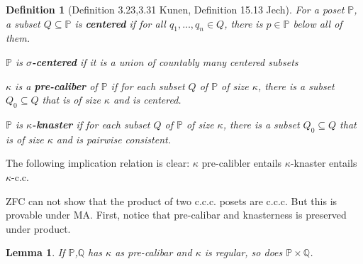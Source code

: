 \documentclass{article}
\newtheorem{definition}{Definition}
\newtheorem{lemma}{Lemma}
\newcommand{\bbP}{\mathbb{P}}
\newcommand{\bbQ}{\mathbb{Q}}
\begin{document}



\begin{definition}[Definition 3.23,3.31 Kunen, Definition 15.13 Jech]
    For a poset $\bbP$, a subset $Q\subseteq \bbP$ is \textbf{centered} if for all $q_1,\dots,q_n\in Q$, there is $p\in \bbP$ below all of them.

    $\bbP$ is \textbf{$\sigma$-centered} if it is a union of countably many centered subsets

    $\kappa$ is a \textbf{pre-caliber} of $\bbP$ if for each subset $Q$ of $\bbP$ of size $\kappa$, there is a subset $Q_0\subseteq Q$ that is of size $\kappa$ and is centered.

    $\bbP$ is \textbf{$\kappa$-knaster} if for each subset $Q$ of $\bbP$ of size $\kappa$, there is a subset $Q_0\subseteq Q$ that is of size $\kappa$ and is pairwise consistent.
\end{definition}

The following implication relation is clear: $\kappa$ pre-calibler entails $\kappa$-knaster entails $\kappa$-c.c.

ZFC can not show that the product of two c.c.c. posets are c.c.c. But this is provable under MA. First, notice that pre-calibar and knasterness is preserved under product.

\begin{lemma}
    If $\bbP$,$\bbQ$ has $\kappa$ as pre-calibar and $\kappa$ is regular, so does $\bbP\times \bbQ$.
\end{lemma}
\end{document}
